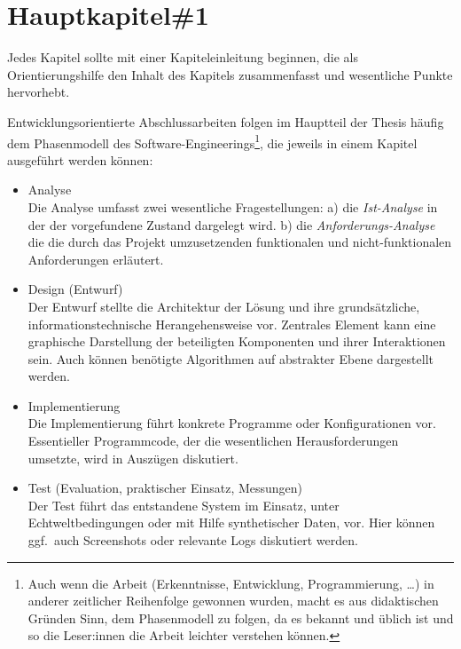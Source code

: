 \chapter{Hauptkapitel\#1}

Jedes Kapitel sollte mit einer Kapiteleinleitung beginnen, die als Orientierungshilfe den Inhalt des Kapitels zusammenfasst und wesentliche Punkte hervorhebt.

Entwicklungsorientierte Abschlussarbeiten folgen im Hauptteil der Thesis häufig dem Phasenmodell des Software-Engineerings\footnote{Auch wenn die Arbeit (Erkenntnisse, Entwicklung, Programmierung, \ldots) in anderer
zeitlicher Reihenfolge gewonnen wurden, macht es aus didaktischen Gründen Sinn, dem Phasenmodell zu folgen, da es bekannt und üblich ist und so die Leser:innen die Arbeit leichter verstehen können.}, die jeweils in einem Kapitel ausgeführt werden können:
\begin{itemize}\setlength{\parskip}{1ex}

\item Analyse\\
Die Analyse umfasst zwei wesentliche Fragestellungen: a) die \emph{Ist-Analyse} in der der vorgefundene Zustand dargelegt wird. b) die \emph{Anforderungs-Analyse} die die durch das Projekt umzusetzenden 
funktionalen und nicht-funktionalen Anforderungen erläutert.

\item Design (Entwurf)\\
Der Entwurf stellte die Architektur der Lösung und ihre grundsätzliche, informationstechnische Herangehensweise vor. 
Zentrales Element kann eine graphische Darstellung der beteiligten Komponenten und ihrer Interaktionen sein. Auch können benötigte Algorithmen auf abstrakter Ebene dargestellt werden.

\item Implementierung\\
Die Implementierung führt konkrete Programme oder Konfigurationen vor. Essentieller Programmcode, der die wesentlichen Herausforderungen umsetzte, wird in Auszügen diskutiert.

\item Test (Evaluation, praktischer Einsatz, Messungen)\\
Der Test führt das entstandene System im Einsatz, unter Echtweltbedingungen oder mit Hilfe synthetischer Daten, vor. Hier können ggf.\ auch Screenshots oder relevante Logs diskutiert werden.
\end{itemize}

